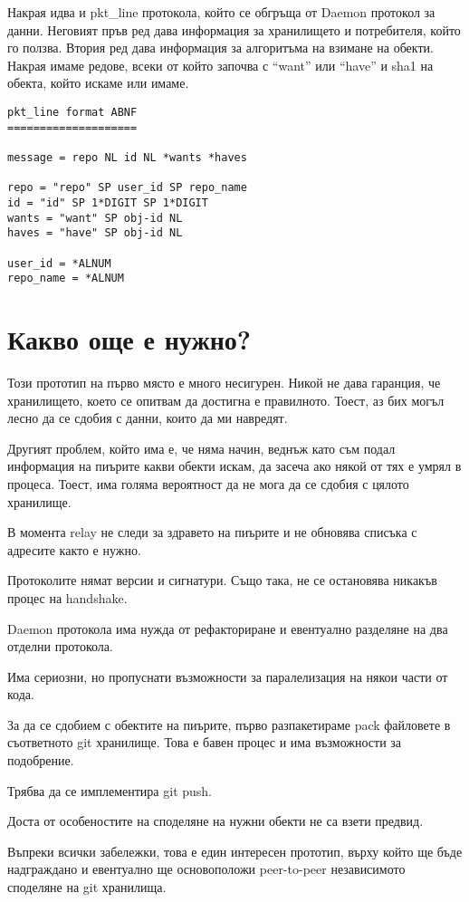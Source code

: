 \documentclass[a4paper,12pt]{article}
\begin{document}
Накрая идва и pkt\_line протокола, който се обгръща от Daemon протокол за данни.
Неговият пръв ред дава информация за хранилището и потребителя, който го ползва.
Втория ред дава информация за алгоритъма на взимане на обекти. Накрая имаме
редове, всеки от който започва с ``want'' или ``have'' и sha1 на обекта, който 
искаме или имаме.

\begin{verbatim}
pkt_line format ABNF
====================

message = repo NL id NL *wants *haves

repo = "repo" SP user_id SP repo_name
id = "id" SP 1*DIGIT SP 1*DIGIT
wants = "want" SP obj-id NL
haves = "have" SP obj-id NL

user_id = *ALNUM
repo_name = *ALNUM
\end{verbatim}

\section{Какво още е нужно?}

Този прототип на първо място е много несигурен. Никой не дава гаранция, че 
хранилището, което се опитвам да достигна е правилното. Тоест, аз бих могъл
лесно да се сдобия с данни, които да ми навредят.

Другият проблем, който има е, че няма начин, веднъж като съм подал информация
на пиърите какви обекти искам, да засеча ако някой от тях е умрял в процеса.
Тоест, има голяма вероятност да не мога да се сдобия с цялото хранилище.

В момента relay не следи за здравето на пиърите и не обновява списъка с адресите
както е нужно.

Протоколите нямат версии и сигнатури. Също така, не се остановява никакъв процес
на handshake.

Daemon протокола има нужда от рефакториране и евентуално разделяне на два отделни
протокола.

Има сериозни, но пропуснати възможности за паралелизация на някои части от кода.

За да се сдобием с обектите на пиърите, първо разпакетираме pack файловете в
съответното git хранилище. Това е бавен процес и има възможности за подобрение.

Трябва да се имплементира git push.

Доста от особеностите на споделяне на нужни обекти не са взети предвид.

Въпреки всички забележки, това е един интересен прототип, върху който ще бъде
надграждано и евентуално ще основоположи peer-to-peer независимото споделяне
на git хранилища.
\end{document}
